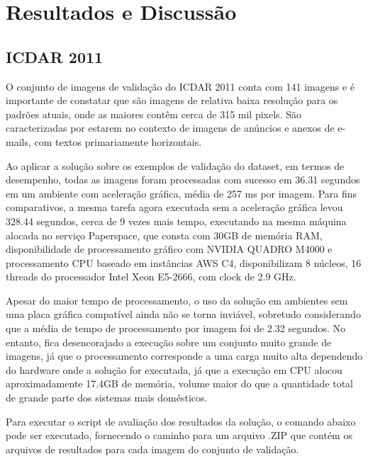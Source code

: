 \chapter{Resultados e Discussão}\label{cap:resultados}

\lipsum[72]


\section{ICDAR 2011}\label{sec:results_icdar_2011}
O conjunto de imagens de validação do ICDAR 2011 conta com 141 imagens e é importante de constatar que são imagens de relativa baixa resolução para os padrões atuais, onde as maiores contêm cerca de 315 mil pixels. São caracterizadas por estarem no contexto de imagens de anúncios e anexos de e-mails, com textos primariamente horizontais.

Ao aplicar a solução sobre os exemplos de validação do dataset, em termos de desempenho, todas as imagens foram processadas com sucesso em 36.31 segundos em um ambiente com aceleração gráfica, média de 257 ms por imagem. Para fins comparativos, a mesma tarefa agora executada sem a aceleração gráfica levou 328.44 segundos, cerca de 9 vezes mais tempo, executando na mesma máquina alocada no serviço Paperspace, que consta com 30GB de memória RAM, disponibilidade de processamento gráfico com NVIDIA QUADRO M4000 e processamento CPU baseado em instâncias AWS C4, disponibilizam 8 núcleos, 16 threads do processador Intel Xeon E5-2666, com clock de 2.9 GHz.

Apesar do maior tempo de processamento, o uso da solução em ambientes sem uma placa gráfica compatível ainda não se torna inviável, sobretudo considerando que a média de tempo de processamento por imagem foi de 2.32 segundos. No entanto, fica desencorajado a execução sobre um conjunto muito grande de imagens, já que o processamento corresponde a uma carga muito alta dependendo do hardware onde a solução for executada, já que a execução em CPU alocou aproximadamente 17.4GB de memória, volume maior do que a quantidade total de grande parte dos sistemas mais domésticos.

Para executar o script de avaliação dos resultados da solução, o comando abaixo pode ser executado, fornecendo o caminho para um arquivo .ZIP que contém os arquivos de resultados para cada imagem do conjunto de validação.


